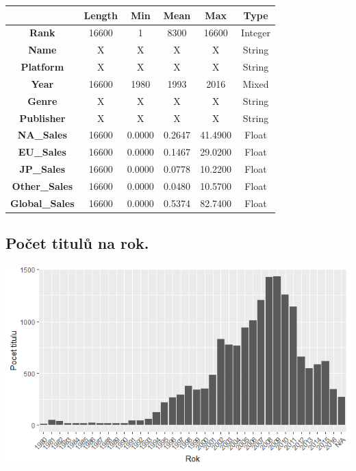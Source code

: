 \documentclass[a4paper,11pt]{article}
\begin{document}
\begin{center}
\begin{tabular}{|c|c|c|c|c|c|}
\hline
\textbf{}              & \textbf{Length} & \textbf{Min} & \textbf{Mean} & \textbf{Max} & \textbf{Type} \\ \hline
\textbf{Rank}          & 16600           & 1            & 8300          & 16600        & Integer       \\ \hline
\textbf{Name}          & X               & X            & X             & X            & String        \\ \hline
\textbf{Platform}      & X               & X            & X             & X            & String        \\ \hline
\textbf{Year}          & 16600           & 1980         & 1993          & 2016         & Mixed         \\ \hline
\textbf{Genre}         & X               & X            & X             & X            & String        \\ \hline
\textbf{Publisher}     & X               & X            & X             & X            & String        \\ \hline
\textbf{NA\_Sales}     & 16600           & 0.0000       & 0.2647        & 41.4900      & Float         \\ \hline
\textbf{EU\_Sales}     & 16600           & 0.0000       & 0.1467        & 29.0200      & Float         \\ \hline
\textbf{JP\_Sales}     & 16600           & 0.0000       & 0.0778        & 10.2200      & Float         \\ \hline
\textbf{Other\_Sales}  & 16600           & 0.0000       & 0.0480        & 10.5700      & Float         \\ \hline
\textbf{Global\_Sales} & 16600           & 0.0000       & 0.5374        & 82.7400      & Float         \\ \hline
\end{tabular}
\end{center}



\newpage


\subsection{Počet titulů na rok.}

\includegraphics[scale=0.8]{Rplot}
\end{document}
